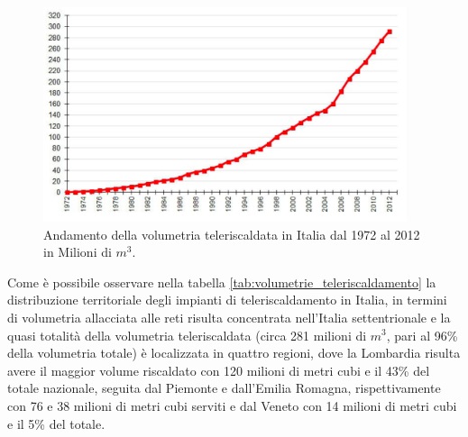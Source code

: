 \documentclass[laurea,oneside,11pt]{USiena_tesiLM}
\begin{document}
\begin{figure}[!ht]
\centering
\includegraphics[width=0.95\textwidth]{figure/volumetria_teleriscaldata} 
\caption{Andamento della volumetria teleriscaldata in Italia dal 1972 al 2012 in Milioni di $m^3$.}
\label{fig:volumetria_teleriscaldata}
\end{figure}

Come è possibile osservare nella tabella \ref{tab:volumetrie_teleriscaldamento} la distribuzione territoriale degli impianti di teleriscaldamento in Italia, in termini di volumetria allacciata alle reti risulta concentrata nell'Italia settentrionale e la quasi totalità della volumetria teleriscaldata (circa 281 milioni di $m^3$, pari al 96\% della volumetria totale) è localizzata in quattro regioni, dove la Lombardia risulta avere il maggior volume riscaldato con 120 milioni di metri cubi e il 43\% del totale nazionale, seguita dal Piemonte e dall'Emilia Romagna, rispettivamente con 76 e 38 milioni di metri cubi serviti e dal Veneto con 14 milioni di metri cubi e il 5\% del totale.
\end{document}
